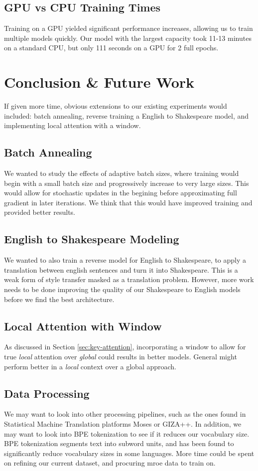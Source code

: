 \documentclass[twoside,twocolumn]{article}
\begin{document}
\subsection{GPU vs CPU Training Times}
Training on a GPU yielded significant performance increases, allowing us to
train multiple models quickly. Our model with the largest capacity took 11-13
minutes on a standard CPU, but only 111 seconds on a GPU for 2 full epochs.
\section{Conclusion \& Future Work}
\label{sec:conclusion}
If given more time, obvious extensions to our existing experiments would
included: batch annealing, reverse training a English to Shakespeare model,
and implementing local attention with a window.
\subsection{Batch Annealing}
We wanted to study the effects of adaptive batch sizes, where training would
begin with a small batch size and progressively increase to very large sizes.
This would allow for stochastic updates in the begining before approximating
full gradient in later iterations. We think that this would have improved
training and provided better results.
\subsection{English to Shakespeare Modeling}
We wanted to also train a reverse model for English to Shakespeare, to apply
a translation between english sentences and turn it into Shakespeare. This
is a weak form of style transfer masked as a translation problem. However, more
work needs to be done improving the quality of our Shakespeare to English models
before we find the best architecture.
\subsection{Local Attention with Window}
As discussed in Section \ref{sec:key-attention}, incorporating a window to allow
for true \emph{local} attention over \emph{global} could results in better
models. General might perform better in a \emph{local} context over a global
approach.
\subsection{Data Processing}
We may want to look into other processing pipelines, such as the ones found
in Statistical Machine Translation platforms Moses or GIZA++. In addition,
we may want to look into BPE tokenization to see if it reduces our vocabulary
size. BPE tokenization segments text into subword units, and has been found
to significantly reduce vocabulary sizes in some languages. More time could be
spent on refining our current dataset, and procuring mroe data to train on.
\end{document}
